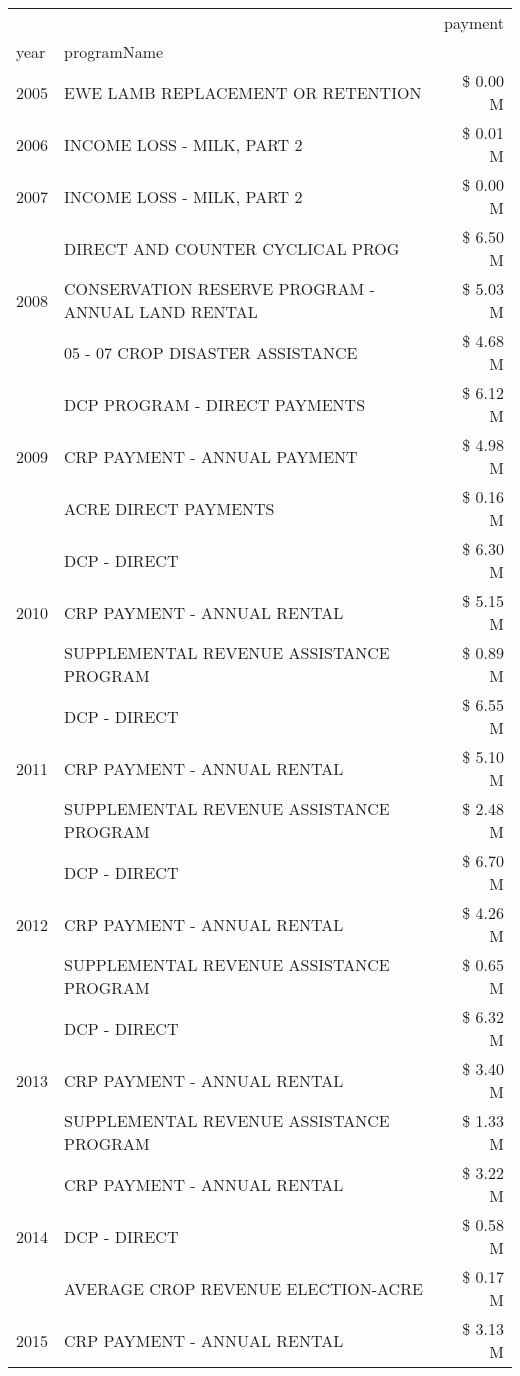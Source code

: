 \begin{tabular}{llr}
\toprule
 &  & payment \\
year & programName &  \\
\midrule
2005 & EWE LAMB REPLACEMENT OR RETENTION & \$ 0.00 M \\
\cline{1-3}
2006 & INCOME LOSS - MILK, PART 2 & \$ 0.01 M \\
\cline{1-3}
2007 & INCOME LOSS - MILK, PART 2 & \$ 0.00 M \\
\cline{1-3}
\multirow[t]{3}{*}{2008} & DIRECT AND COUNTER CYCLICAL PROG & \$ 6.50 M \\
 & CONSERVATION RESERVE PROGRAM - ANNUAL LAND RENTAL & \$ 5.03 M \\
 & 05 - 07 CROP DISASTER ASSISTANCE & \$ 4.68 M \\
\cline{1-3}
\multirow[t]{3}{*}{2009} & DCP PROGRAM - DIRECT PAYMENTS & \$ 6.12 M \\
 & CRP PAYMENT - ANNUAL PAYMENT & \$ 4.98 M \\
 & ACRE DIRECT PAYMENTS & \$ 0.16 M \\
\cline{1-3}
\multirow[t]{3}{*}{2010} & DCP - DIRECT & \$ 6.30 M \\
 & CRP PAYMENT - ANNUAL RENTAL & \$ 5.15 M \\
 & SUPPLEMENTAL REVENUE ASSISTANCE PROGRAM & \$ 0.89 M \\
\cline{1-3}
\multirow[t]{3}{*}{2011} & DCP - DIRECT & \$ 6.55 M \\
 & CRP PAYMENT - ANNUAL RENTAL & \$ 5.10 M \\
 & SUPPLEMENTAL REVENUE ASSISTANCE PROGRAM & \$ 2.48 M \\
\cline{1-3}
\multirow[t]{3}{*}{2012} & DCP - DIRECT & \$ 6.70 M \\
 & CRP PAYMENT - ANNUAL RENTAL & \$ 4.26 M \\
 & SUPPLEMENTAL REVENUE ASSISTANCE PROGRAM & \$ 0.65 M \\
\cline{1-3}
\multirow[t]{3}{*}{2013} & DCP - DIRECT & \$ 6.32 M \\
 & CRP PAYMENT - ANNUAL RENTAL & \$ 3.40 M \\
 & SUPPLEMENTAL REVENUE ASSISTANCE PROGRAM & \$ 1.33 M \\
\cline{1-3}
\multirow[t]{3}{*}{2014} & CRP PAYMENT - ANNUAL RENTAL & \$ 3.22 M \\
 & DCP - DIRECT & \$ 0.58 M \\
 & AVERAGE CROP REVENUE ELECTION-ACRE & \$ 0.17 M \\
\cline{1-3}
\multirow[t]{3}{*}{2015} & CRP PAYMENT - ANNUAL RENTAL & \$ 3.13 M \\

\end{tabular}
